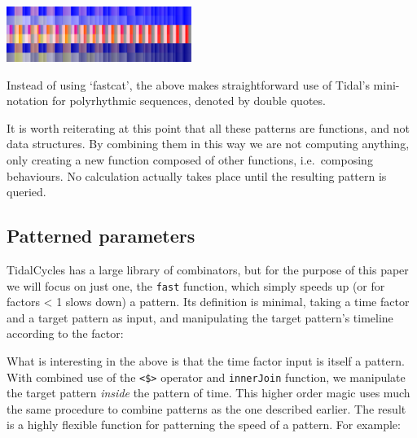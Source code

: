 \documentclass{nime-alternate} %
\newenvironment{Shaded}{\begin{snugshade}}{\end{snugshade}}
\newcommand{\NormalTok}[1]{#1}
\newcommand{\OperatorTok}[1]{\textcolor[rgb]{0.81,0.36,0.00}{\textbf{#1}}}
\newcommand{\OtherTok}[1]{\textcolor[rgb]{0.56,0.35,0.01}{#1}}
\begin{document}
\includegraphics[width=0.45\textwidth]{figures/83bfba2f16ef59ec40127dd48d4c94e5_gradient_0.pdf}

Instead of using `fastcat', the above makes straightforward use of
Tidal's mini-notation for polyrhythmic sequences, denoted by double
quotes.

It is worth reiterating at this point that all these patterns are
functions, and not data structures. By combining them in this way we are
not computing anything, only creating a new function composed of other
functions, i.e.~composing behaviours. No calculation actually takes
place until the resulting pattern is queried.

\hypertarget{patterned-parameters}{%
\subsection{Patterned parameters}\label{patterned-parameters}}

TidalCycles has a large library of combinators, but for the purpose of
this paper we will focus on just one, the \texttt{fast} function, which
simply speeds up (or for factors \textless{} 1 slows down) a pattern.
Its definition is minimal, taking a time factor and a target pattern as
input, and manipulating the target pattern's timeline according to the
factor:

\begin{Shaded}
\end{Shaded}

What is interesting in the above is that the time factor input is itself
a pattern. With combined use of the \texttt{\textless{}\$\textgreater{}}
operator and \texttt{innerJoin} function, we manipulate the target
pattern \emph{inside} the pattern of time. This higher order magic uses
much the same procedure to combine patterns as the one described
earlier. The result is a highly flexible function for patterning the
speed of a pattern. For example:
\end{document}
